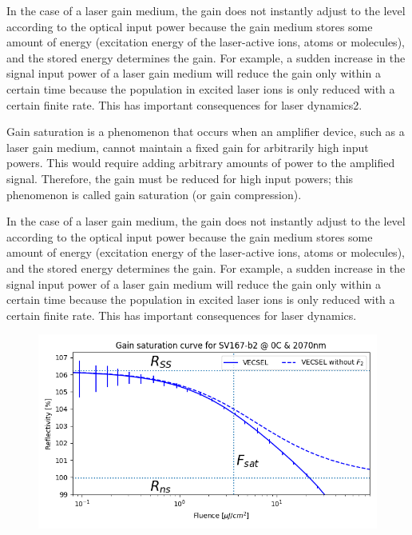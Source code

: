 In the case of a laser gain medium, the gain does not instantly adjust to the level according to the optical input power because the gain medium stores some amount of energy (excitation energy of the laser-active ions, atoms or molecules), and the stored energy determines the gain. For example, a sudden increase in the signal input power of a laser gain medium will reduce the gain only within a certain time because the population in excited laser ions is only reduced with a certain finite rate. This has important consequences for laser dynamics2.

Gain saturation is a phenomenon that occurs when an amplifier device, such as a laser gain medium, cannot maintain a fixed gain for arbitrarily high input powers. This would require adding arbitrary amounts of power to the amplified signal. Therefore, the gain must be reduced for high input powers; this phenomenon is called gain saturation (or gain compression).

In the case of a laser gain medium, the gain does not instantly adjust to the level according to the optical input power because the gain medium stores some amount of energy (excitation energy of the laser-active ions, atoms or molecules), and the stored energy determines the gain. For example, a sudden increase in the signal input power of a laser gain medium will reduce the gain only within a certain time because the population in excited laser ions is only reduced with a certain finite rate. This has important consequences for laser dynamics.

\begin{figure}[h]
    \centering
    \includegraphics[width=12cm]{images/gainSat.png}
\end{figure}
